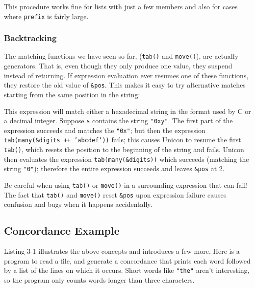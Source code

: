 
This procedure works fine for lists with just a few members and also for
cases where \texttt{prefix} is fairly large.

\subsubsection*{Backtracking}

The matching functions we have seen so far,
(\texttt{tab()} and \texttt{move()}), are actually
generators. That is, even though they only produce one
value, they suspend instead of returning. If expression evaluation ever
resumes one of these functions, they restore the old value of
\texttt{\&pos}. This makes it easy to try alternative matches starting
from the same position in the string:


This expression will match either a hexadecimal string in the format
used by C or a decimal integer. Suppose \texttt{s} contains the string
\texttt{"0xy"}. The first part of the
expression succeeds and matches the
\texttt{"0x"}; but then the expression
\texttt{tab(many(\&digits ++
'abcdef'))} fails; this causes Unicon
to resume the first \texttt{tab()}, which resets the position to the
beginning of the string and fails. Unicon then evaluates the expression
\texttt{tab(many(\&digits))} which succeeds (matching the string
\texttt{"0"}); therefore the entire
expression succeeds and leaves \texttt{\&pos} at 2.

\medskip{}
{\sffamily
Be careful when using \texttt{tab()} or \texttt{move()} in a
surrounding expression that can fail! The fact that \texttt{tab()}
and \texttt{move()} reset \texttt{\&pos} upon expression
failure causes confusion and bugs when it happens accidentally.}\medskip

\subsection*{Concordance Example}

Listing 3-1 illustrates the above concepts and introduces a few more.
Here is a program to read a file, and generate a
concordance that prints each word followed by a list
of the lines on which it occurs. Short words like
\texttt{"the"} aren't
interesting, so the program only counts words longer than three
characters.

